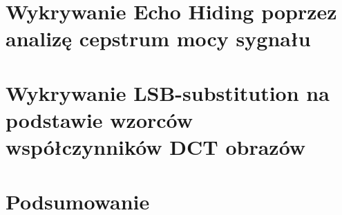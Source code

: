 \documentclass[a4paper,12pt]{article}
\begin{document}
\clearpage
\section{Wykrywanie Echo Hiding poprzez analizę cepstrum mocy sygnału}


\clearpage
\section{Wykrywanie LSB-substitution na podstawie wzorców współczynników DCT obrazów}


\section{Podsumowanie}

\printbibliography[title={Źródła}] %
\end{document}
